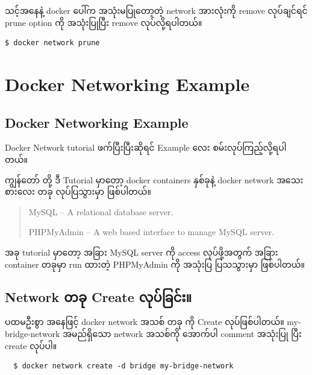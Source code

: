 သင့်အနေနဲ့ docker ပေါ်က အသုံးမပြုတော့တဲ့ network အားလုံးကို remove
လုပ်ချင်ရင် prune option ကို အသုံးပြုပြီး remove လုပ်လို့ရပါတယ်။

\begin{verbatim}
$ docker network prune
\end{verbatim}

\pagebreak

\hypertarget{docker-networking-example-2}{%
\section{Docker Networking Example}\label{docker-networking-example-2}}

\hypertarget{docker-networking-example-3}{%
\subsection{Docker Networking
Example}\label{docker-networking-example-3}}

Docker Network tutorial ဖက်ပြီးပြီးဆိုရင် Example လေး
စမ်းလုပ်ကြည့်လို့ရပါတယ်။

ကျွန်တော် တို့ ဒီ Tutorial မှာတော့ docker containers နှစ်ခုနဲ့ docker
network အသေးစားလေး တခု လုပ်ပြသွားမှာ ဖြစ်ပါတယ်။

\begin{quote}
MySQL -- A relational database server.

PHPMyAdmin -- A web based interface to manage MySQL server.
\end{quote}

အခု tutorial မှာတော့ အခြား MySQL server ကို access လုပ်ဖို့အတွက် အခြား
container တခုမှာ run ထားတဲ့ PHPMyAdmin ကို အသုံးပြ ပြသသွားမှာ ဖြစ်ပါတယ်။

\hypertarget{network-ux1010ux1001ux102f-create-ux101cux102fux1015ux103aux1001ux103cux1004ux103aux1038-1}{%
\subsection{Network တခု Create
လုပ်ခြင်း။}\label{network-ux1010ux1001ux102f-create-ux101cux102fux1015ux103aux1001ux103cux1004ux103aux1038-1}}

ပထမဦးစွာ အနေဖြင့် docker network အသစ် တခု ကို Create လုပ်ဖြစ်ပါတယ်။
my-bridge-network အမည်ရှိသော network အသစ်ကို အောက်ပါ comment အသုံးပြု
ပြီး create လုပ်ပါ။

\begin{verbatim}
  $ docker network create -d bridge my-bridge-network
\end{verbatim}

